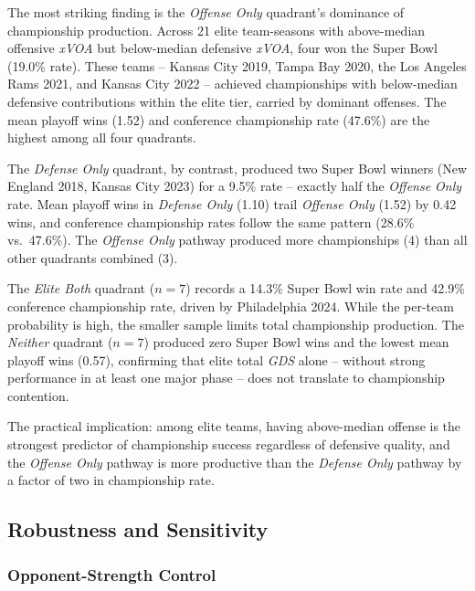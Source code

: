 \documentclass[12pt,a4paper]{article}
\newcommand{\xvoa}{\textit{xVOA}}
\newcommand{\gds}{\textit{GDS}}
\begin{document}
The most striking finding is the \textit{Offense Only} quadrant's dominance of championship production. Across 21 elite team-seasons with above-median offensive \xvoa{} but below-median defensive \xvoa{}, four won the Super Bowl (19.0\% rate). These teams -- Kansas City 2019, Tampa Bay 2020, the Los Angeles Rams 2021, and Kansas City 2022 -- achieved championships with below-median defensive contributions within the elite tier, carried by dominant offenses. The mean playoff wins (1.52) and conference championship rate (47.6\%) are the highest among all four quadrants.

The \textit{Defense Only} quadrant, by contrast, produced two Super Bowl winners (New England 2018, Kansas City 2023) for a 9.5\% rate -- exactly half the \textit{Offense Only} rate. Mean playoff wins in \textit{Defense Only} (1.10) trail \textit{Offense Only} (1.52) by 0.42 wins, and conference championship rates follow the same pattern (28.6\% vs.\ 47.6\%). The \textit{Offense Only} pathway produced more championships (4) than all other quadrants combined (3).

The \textit{Elite Both} quadrant ($n = 7$) records a 14.3\% Super Bowl win rate and 42.9\% conference championship rate, driven by Philadelphia 2024. While the per-team probability is high, the smaller sample limits total championship production. The \textit{Neither} quadrant ($n = 7$) produced zero Super Bowl wins and the lowest mean playoff wins (0.57), confirming that elite total \gds{} alone -- without strong performance in at least one major phase -- does not translate to championship contention.

The practical implication: among elite teams, having above-median offense is the strongest predictor of championship success regardless of defensive quality, and the \textit{Offense Only} pathway is more productive than the \textit{Defense Only} pathway by a factor of two in championship rate.

\subsection{Robustness and Sensitivity}
\label{sec:robustness}

\subsubsection{Opponent-Strength Control}
\end{document}
